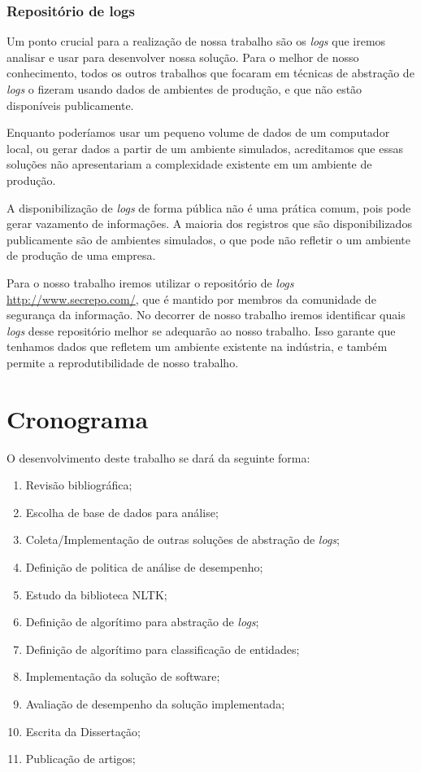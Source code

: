 \documentclass[
	12pt,				%
	openright,			%
	twoside,			%
	a4paper,			%
	english,			%
	spanish,			%
	brazil,				%
	]{abntex2}
\begin{document}
\subsection{Repositório de logs}

Um ponto crucial para a realização de nossa trabalho são os \emph{logs} que iremos analisar e usar para desenvolver nossa solução. Para o melhor de nosso conhecimento, todos os outros trabalhos que focaram em técnicas de abstração de \emph{logs} o fizeram usando dados de ambientes de produção, e que não estão disponíveis publicamente.

Enquanto poderíamos usar um pequeno volume de dados de um computador local, ou gerar dados a partir de um ambiente simulados, acreditamos que essas soluções não apresentariam a complexidade existente em um ambiente de produção.

A disponibilização de \emph{logs} de forma pública não é uma prática comum, pois pode gerar vazamento de informações. A maioria dos registros que são disponibilizados publicamente são de ambientes simulados, o que pode não refletir o um ambiente de produção de uma empresa.

Para o nosso trabalho iremos utilizar o repositório de \emph{logs} \url{http://www.secrepo.com/}, que é mantido por membros da comunidade de segurança da informação. No decorrer de nosso trabalho iremos identificar quais \emph{logs} desse repositório melhor se adequarão ao nosso trabalho. Isso garante que tenhamos dados que refletem um ambiente existente na indústria, e também permite a reprodutibilidade de nosso trabalho.

\chapter{Cronograma}\label{chap:cronograma}
O desenvolvimento deste trabalho se dará da seguinte forma:

\begin{enumerate}
	\item \label{rev-bibli} Revisão bibliográfica;
	\item \label{esc-base} Escolha de base de dados para análise;
	\item \label{imp-outras} Coleta/Implementação de outras soluções de abstração de \emph{logs};
	\item \label{def-pol} Definição de politica de análise de desempenho;
	\item \label{est-nltk} Estudo da biblioteca NLTK;
	\item \label{algo-abs} Definição de algorítimo para abstração de \emph{logs};
	\item \label{algo-clas} Definição de algorítimo para classificação de entidades;
	\item \label{imp-sol} Implementação da solução de software;
	\item \label{ava-des} Avaliação de desempenho da solução implementada;
	\item \label{esc-dis} Escrita da Dissertação;
	\item \label{pub-art} Publicação de artigos;	
\end{enumerate}
\end{document}
